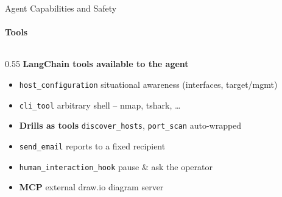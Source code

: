 \begin{frame}{Agent Capabilities and Safety}
    \framesubtitle{Tools}

    \begin{columns}[T,onlytextwidth]
        \begin{column}{0.55\textwidth}
            \textbf{LangChain tools available to the agent}
            \begin{itemize}
                \item[\faNetworkWired] \texttt{host\_configuration} \scriptsize situational awareness (interfaces, target/mgmt)
                \item[\faTerminal] \texttt{cli\_tool} \scriptsize arbitrary shell -- nmap, tshark, \ldots
                \item[\faCogs] \textbf{Drills as tools} \scriptsize \texttt{discover\_hosts}, \texttt{port\_scan} auto-wrapped
                \item[\faEnvelope] \texttt{send\_email} \scriptsize reports to a fixed recipient
                \item[\faUser] \texttt{human\_interaction\_hook} \scriptsize pause \& ask the operator
                \item[\faPlug] \textbf{MCP} \scriptsize external draw.io diagram server
            \end{itemize}
        \end{column}
    \end{columns}
\end{frame}


